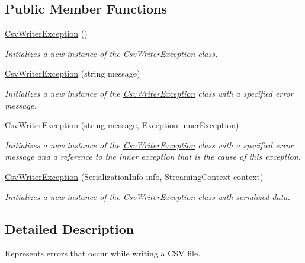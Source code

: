 \subsection*{Public Member Functions}
\begin{DoxyCompactItemize}
\item 
\hyperlink{a00060_a4e5030012e1258c3db3da1725c0d9332}{Csv\-Writer\-Exception} ()
\begin{DoxyCompactList}\small\item\em Initializes a new instance of the \hyperlink{a00060}{Csv\-Writer\-Exception} class. \end{DoxyCompactList}\item 
\hyperlink{a00060_a6d01cb3854a95d77cd1f9e2d8b1aa304}{Csv\-Writer\-Exception} (string message)
\begin{DoxyCompactList}\small\item\em Initializes a new instance of the \hyperlink{a00060}{Csv\-Writer\-Exception} class with a specified error message. \end{DoxyCompactList}\item 
\hyperlink{a00060_aedacd3e9a9161a62991cc1d388298a14}{Csv\-Writer\-Exception} (string message, Exception inner\-Exception)
\begin{DoxyCompactList}\small\item\em Initializes a new instance of the \hyperlink{a00060}{Csv\-Writer\-Exception} class with a specified error message and a reference to the inner exception that is the cause of this exception. \end{DoxyCompactList}\item 
\hyperlink{a00060_ac4ae90ce8433632c2047d4de364effa6}{Csv\-Writer\-Exception} (Serialization\-Info info, Streaming\-Context context)
\begin{DoxyCompactList}\small\item\em Initializes a new instance of the \hyperlink{a00060}{Csv\-Writer\-Exception} class with serialized data. \end{DoxyCompactList}\end{DoxyCompactItemize}


\subsection{Detailed Description}
Represents errors that occur while writing a C\-S\-V file. 



